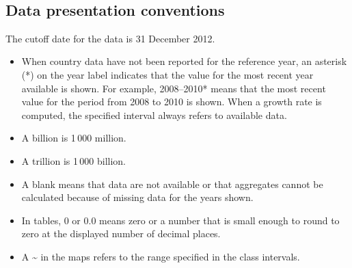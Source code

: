 \ 
\subsection{Data presentation conventions}

The cutoff date for the data is 31 December 2012.

\begin{itemize}

\item  When country data have not been reported for the reference year, an asterisk (*) on the year label indicates that the value for the most recent year available is shown. For example, 2008–2010* means that the most recent value for the period from 2008 to 2010 is shown. When a growth rate is computed, the specified interval always refers to available data.

\item A billion is 1\,000 million.

\item A trillion is 1\,000 billion.

\item A blank means that data are not available or that aggregates cannot be calculated because of missing data for the years shown.

\item In tables, 0 or 0.0 means zero or a number that is small enough to round to zero at the displayed number of decimal places.

\item  A \textasciitilde{} in the maps refers to the range specified in the class intervals.

\end{itemize}

